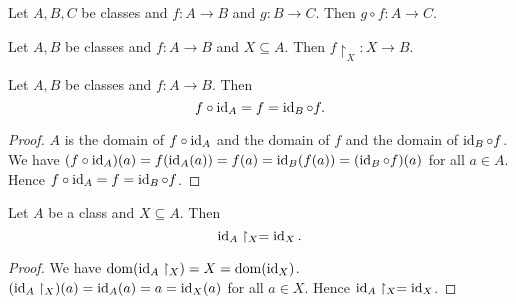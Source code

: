 \documentclass[../set-theory.tex]{subfiles}
\begin{document}
  \begin{forthel}
    \begin{proposition}\label{SET_THEORY_06_1706446651654144}
      Let $A, B, C$ be classes and $f : A \to B$ and $g : B \to C$.
      Then $g \circ f : A \to C$.
    \end{proposition}
  \end{forthel}

  \begin{forthel}
    \begin{proposition}\label{SET_THEORY_06_4078561256275968}
      Let $A, B$ be classes and $f : A \to B$ and $X \subseteq A$.
      Then $f \restriction_{X} : X \to B$.
    \end{proposition}
  \end{forthel}

  \begin{forthel}
    \begin{proposition}\label{SET_THEORY_06_3964401904254976}
      Let $A, B$ be classes and $f : A \to B$.
      Then \[ f \circ \operatorname{id}_{A} = f = \operatorname{id}_{B} \circ f. \]
    \end{proposition}
    \begin{proof}
      $A$ is the domain of $f \circ \operatorname{id}_{A}$ and the domain of $f$ and the domain of $\operatorname{id}_{B} \circ f$.
      We have $(f \circ \operatorname{id}_{A})(a) =
      f(\operatorname{id}_{A}(a)) =
      f(a) =
      \operatorname{id}_{B}(f(a)) =
      (\operatorname{id}_{B} \circ f)(a)$ for all $a \in A$.
      Hence $f \circ \operatorname{id}_{A} = f = \operatorname{id}_{B} \circ f$.
    \end{proof}
  \end{forthel}

  \begin{forthel}
    \begin{proposition}\label{SET_THEORY_06_3118771061391360}
      Let $A$ be a class and $X \subseteq A$.
      Then \[ \operatorname{id}_{A} \restriction_{X} = \operatorname{id}_{X}. \]
    \end{proposition}
    \begin{proof}
      We have $\operatorname{dom}(\operatorname{id}_{A} \restriction_{X}) = X = \operatorname{dom}(\operatorname{id}_{X})$.
      $(\operatorname{id}_{A} \restriction_{X})(a) = \operatorname{id}_{A}(a) = a = \operatorname{id}_{X}(a)$ for all $a \in X$.
      Hence $\operatorname{id}_{A} \restriction_{X} = \operatorname{id}_{X}$.
    \end{proof}
  \end{forthel}
\end{document}
